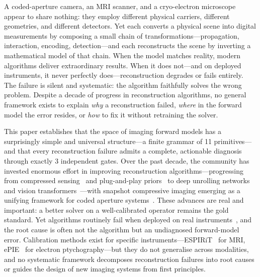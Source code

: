 \documentclass[11pt]{article}
\begin{document}
\begin{sloppypar}
A coded-aperture camera, an MRI scanner, and a cryo-electron microscope appear to share nothing: they employ different physical carriers, different geometries, and different detectors. Yet each converts a physical scene into digital measurements by composing a small chain of transformations---propagation, interaction, encoding, detection---and each reconstructs the scene by inverting a mathematical model of that chain. When the model matches reality, modern algorithms deliver extraordinary results. When it does not---and on deployed instruments, it never perfectly does---reconstruction degrades or fails entirely. The failure is silent and systematic: the algorithm faithfully solves the wrong problem. Despite a decade of progress in reconstruction algorithms, no general framework exists to explain \emph{why} a reconstruction failed, \emph{where} in the forward model the error resides, or \emph{how} to fix it without retraining the solver.
\end{sloppypar}

This paper establishes that the space of imaging forward models has a surprisingly simple and universal structure---a finite grammar of 11 primitives---and that every reconstruction failure admits a complete, actionable diagnosis through exactly 3 independent gates. Over the past decade, the community has invested enormous effort in improving reconstruction algorithms---progressing from compressed sensing~\cite{candes2008compressed,donoho2006compressed} and plug-and-play priors~\cite{venkatakrishnan2013pnp,yuan2021pnp} to deep unrolling networks~\cite{monga2021unrolling} and vision transformers~\cite{cai2022mst}---with snapshot compressive imaging emerging as a unifying framework for coded aperture systems~\cite{yuan2021sci}. These advances are real and important: a better solver on a well-calibrated operator remains the gold standard. Yet algorithms routinely fail when deployed on real instruments~\cite{antun2020instabilities}, and the root cause is often not the algorithm but an undiagnosed forward-model error. Calibration methods exist for specific instruments---ESPIRiT~\cite{uecker2014espirit} for MRI, ePIE~\cite{maiden2009ptychography} for electron ptychography---but they do not generalise across modalities, and no systematic framework decomposes reconstruction failures into root causes or guides the design of new imaging systems from first principles.
\end{document}
